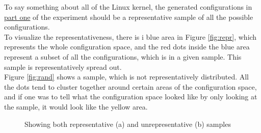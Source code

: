 \documentclass[a4paper,11pt]{report}
\newcommand{\figa}{
    \begin{figure}[!htpb]
    \centering
}
\newcommand{\figb}[2]{
    \caption{#1}
    \label{#2}
    \end{figure}
}
\begin{document}
To say something about all of the Linux kernel, the generated configurations 
in \underline{part one} of the experiment  should be a representative sample of all the 
possible configurations. 
\\


To visualize the representativeness, there is i blue area in Figure \ref{fig:repr}, which represents the whole configuration 
space, and the red dots inside the blue area represent a subset of all the 
configurations, which is in a given sample. This sample is representatively spread out.
\\


Figure \ref{fig:rand} shows a sample, which is not representatively 
distributed. All the dots tend to cluster together around certain areas of the 
configuration space, and if one was to tell what the configuration space looked 
like by only looking at the sample, it would look like the yellow area.

\figa
\figb{Showing both representative (a) and unrepresentative (b) samples}{fig:reprrand}
\end{document}
